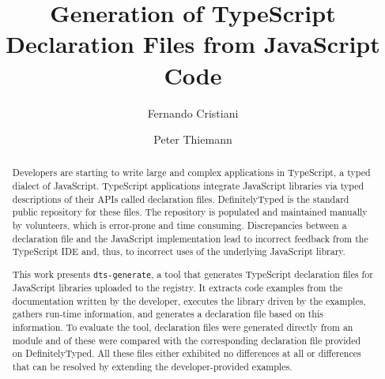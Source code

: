 \documentclass[sigplan,screen]{acmart}
\begin{document}
\title{Generation of TypeScript Declaration Files from JavaScript Code}


\author{Fernando Cristiani}

\author{Peter Thiemann}



\begin{abstract}
  Developers are starting to write large and complex applications in
  TypeScript, a typed dialect of JavaScript. TypeScript applications
  integrate JavaScript libraries via typed descriptions of their APIs
  called declaration files. DefinitelyTyped is the standard public
  repository for these files.
  The repository is populated and maintained manually by volunteers, which
  is error-prone and time consuming. Discrepancies between a
  declaration file and the JavaScript implementation lead to
  incorrect feedback from the TypeScript IDE and, thus, to incorrect uses
  of the underlying JavaScript library.

  This work presents \texttt{dts-generate}, a tool that generates
  TypeScript declaration files for JavaScript libraries uploaded to the \NPM{}
  registry. It extracts code examples from the documentation written by
  the developer, executes the library driven by the examples, gathers
  run-time information, and generates a declaration file based on this
  information. To evaluate the tool, \CountModulesGeneratedDeclarationFile{} declaration files were
  generated directly from an \NPM{} module and \CountModulesOnlySolvableDifferences{} of these were
  compared with the corresponding declaration file provided on
  DefinitelyTyped.  All these files either
  exhibited no differences at all or differences that can be resolved by
  extending the developer-provided examples.
\end{abstract}
\end{document}
